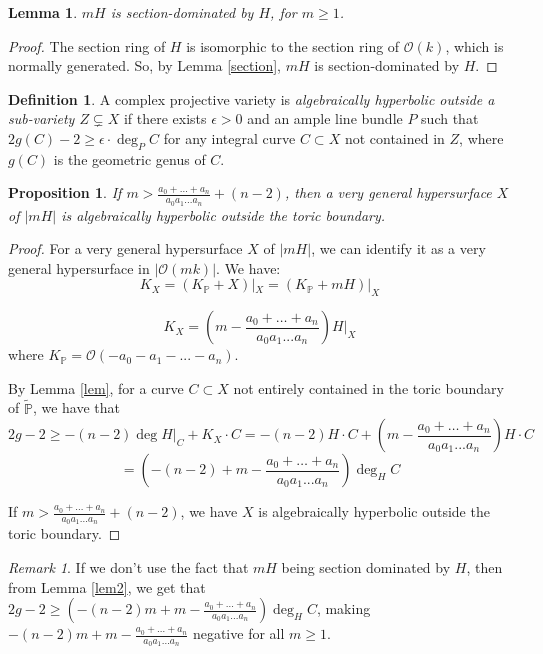 \documentclass{amsart}
\newtheorem{lemma}[theorem]{Lemma}
\newtheorem{proposition}[theorem]{Proposition}
\theoremstyle{definition}
\newtheorem{definition}[theorem]{Definition}
\theoremstyle{remark}
\newtheorem{remark}[theorem]{Remark}
\begin{document}
\begin{lemma}
 $mH$ is section-dominated by $H$, for $m\geq 1$.
\end{lemma}
\begin{proof}
The section ring of $H$ is isomorphic to the section ring of $\mathcal O(k)$, which is normally generated. So, by Lemma \ref{section}, $mH$ is section-dominated by $H$.
\end{proof}
\begin{definition}
 A complex projective variety is \emph{algebraically hyperbolic outside a sub-variety $Z \subsetneq X$} if there exists $\epsilon > 0$ and an ample line bundle $P$ such that $2g(C)-2 \geq\epsilon\cdot\deg_P C$ for any integral curve $C
 \subset X$ not contained in $Z$, where $g(C)$ is the geometric genus of $C$. 
\end{definition}


\begin{proposition}\label{prop2}
 If $m > \frac{a_0 + \dots + a_n}{a_0a_1... a_n} + (n-2)$, then a very general hypersurface $X$ of $|mH|$ is algebraically hyperbolic outside the toric boundary.
\end{proposition}


\begin{proof}
For a very general hypersurface $X$ of $|mH|$, we can identify it as a very general hypersurface in $|\mathcal O(mk)|$. We have:
\[ K_X = (K_{\mathbb{P}} + X)|_X = (K_{\mathbb{P}} + mH)|_X \]

\[ K_X = \left(m - \frac{a_0 + \dots + a_n}{a_0a_1... a_n}\right)H|_X \]
where $K_{\mathbb{P}} = \mathcal O(-a_0-a_1-...-a_n)$.

By Lemma \ref{lem}, for a curve $C\subset X$ not entirely contained in the toric boundary of $\widetilde{\mathbb P}$, we have that
\[ 2g - 2 \geq -(n-2)\deg H|_C + K_X\cdot C=-(n-2)H \cdot C + \left(m - \frac{a_0 + \dots + a_n}{a_0a_1... a_n}\right)H \cdot C \]
\[= \left(-(n-2) + m - \frac{a_0 + \dots + a_n}{a_0a_1... a_n}\right) \deg_H C\]

If $m > \frac{a_0 + \dots + a_n}{a_0a_1... a_n} + (n-2)$, we have $X$ is algebraically hyperbolic outside the toric boundary.
\end{proof}

\begin{remark}
If we don't use the fact that $mH$ being section dominated by $H$, then from Lemma \ref{lem2}, we get that $2g-2 \geq \left(-(n-2)m +m-\frac{a_0 + \dots + a_n}{a_0a_1... a_n} \right)\deg_HC$, making  $-(n-2)m +m-\frac{a_0 + \dots + a_n}{a_0a_1... a_n} $ negative for all $m\geq 1$.
\end{remark}
\end{document}

